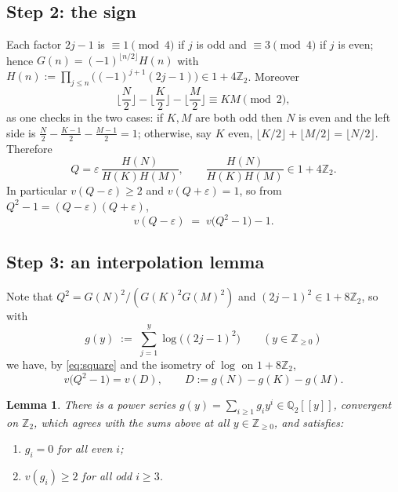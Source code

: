 \documentclass[11pt]{amsart}
\newtheorem{lemma}[theorem]{Lemma}
\theoremstyle{definition}
\newcommand{\ZZ}{\mathbb{Z}}
\newcommand{\QQ}{\mathbb{Q}}
\begin{document}
\subsection*{Step 2: the sign}
Each factor $2j-1$ is $\equiv1\pmod4$ if $j$ is odd and $\equiv3\pmod4$ if $j$ is even; hence
$G(n)=(-1)^{\lfloor n/2\rfloor}H(n)$ with $H(n):=\prod_{j\le n}\big((-1)^{j+1}(2j-1)\big)\in1+4\ZZ_2$. Moreover
\[
\Big\lfloor \frac N2\Big\rfloor-\Big\lfloor \frac K2\Big\rfloor-\Big\lfloor \frac M2\Big\rfloor \equiv KM \pmod 2 ,
\]
as one checks in the two cases: if $K,M$ are both odd then $N$ is even and the left side is $\frac N2-\frac{K-1}2-\frac{M-1}2=1$; otherwise, say $K$ even, $\lfloor K/2\rfloor+\lfloor M/2\rfloor=\lfloor N/2\rfloor$. Therefore
\begin{equation}\label{eq:signsplit}
Q=\varepsilon\,\frac{H(N)}{H(K)H(M)},\qquad \frac{H(N)}{H(K)H(M)}\in 1+4\ZZ_2 .
\end{equation}
In particular $v(Q-\varepsilon)\ge2$ and $v(Q+\varepsilon)=1$, so from $Q^2-1=(Q-\varepsilon)(Q+\varepsilon)$,
\begin{equation}\label{eq:square}
v(Q-\varepsilon)\;=\;v\big(Q^2-1\big)-1 .
\end{equation}

\subsection*{Step 3: an interpolation lemma}
Note that $Q^2=G(N)^2/(G(K)^2G(M)^2)$ and $(2j-1)^2\in1+8\ZZ_2$, so with
\[
g(y)\;:=\;\sum_{j=1}^{y}\log\big((2j-1)^2\big)\qquad(y\in\ZZ_{\ge0})
\]
we have, by \eqref{eq:square} and the isometry of $\log$ on $1+8\ZZ_2$,
\begin{equation}\label{eq:D2}
v\big(Q^2-1\big)=v(D),\qquad D:=g(N)-g(K)-g(M).
\end{equation}

\begin{lemma}\label{lem:interp}
There is a power series $g(y)=\sum_{i\ge1}g_iy^i\in\QQ_2[[y]]$, convergent on $\ZZ_2$, which agrees with the sums above at all $y\in\ZZ_{\ge0}$, and satisfies:
\begin{enumerate}
\item $g_i=0$ for all even $i$;
\item $v(g_i)\ge 2$ for all odd $i\ge3$.
\end{enumerate}
\end{lemma}
\end{document}
